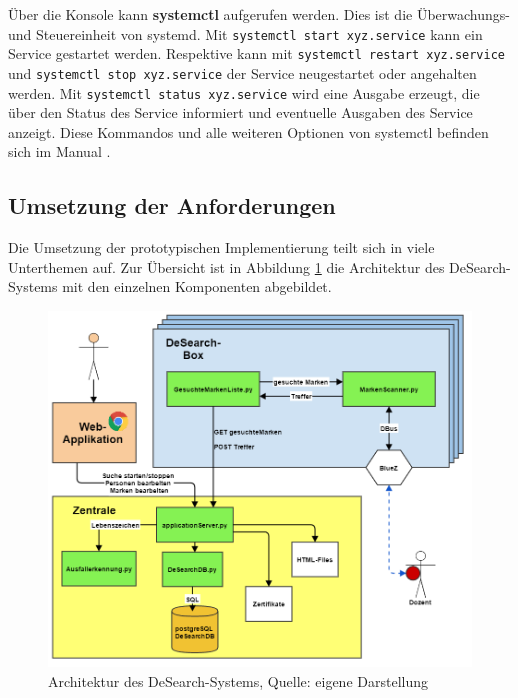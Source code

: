 Über die Konsole kann \textbf{systemctl} aufgerufen werden. Dies ist die Überwachungs- und Steuereinheit von systemd. Mit \texttt{systemctl start xyz.service} kann ein Service gestartet werden. Respektive kann mit  \texttt{systemctl restart xyz.service} und \texttt{systemctl stop xyz.service} der Service neugestartet oder angehalten werden. Mit  \texttt{systemctl status xyz.service} wird eine Ausgabe erzeugt, die über den Status des Service informiert und eventuelle Ausgaben des Service anzeigt. Diese Kommandos und alle weiteren Optionen von systemctl befinden sich im Manual \citep[][]{systemctl-man}.

\subsection{Umsetzung der Anforderungen}
Die Umsetzung der prototypischen Implementierung teilt sich in viele Unterthemen auf. Zur Übersicht ist in Abbildung \ref{fig:architektur} die Architektur des DeSearch-Systems mit den einzelnen Komponenten abgebildet.
\begin{figure}[bth]
	\centering
	\includegraphics[width=1.0\linewidth]{images/schichten.png}
	\caption[Architektur des DeSearch-Systems]{Architektur des DeSearch-Systems, Quelle: eigene Darstellung}
	\label{fig:architektur}
\end{figure}
